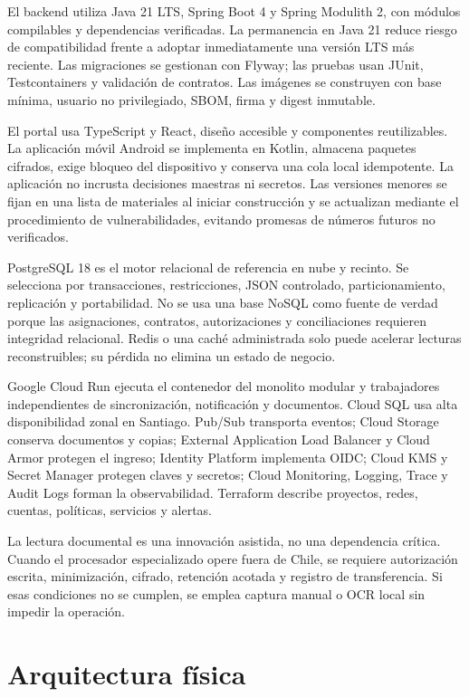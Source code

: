 \documentclass[11pt,letterpaper]{report}
\begin{document}
El backend utiliza Java 21 LTS, Spring Boot 4 y Spring Modulith 2, con módulos compilables y dependencias verificadas. La permanencia en Java 21 reduce riesgo de compatibilidad frente a adoptar inmediatamente una versión LTS más reciente. Las migraciones se gestionan con Flyway; las pruebas usan JUnit, Testcontainers y validación de contratos. Las imágenes se construyen con base mínima, usuario no privilegiado, SBOM, firma y digest inmutable.

El portal usa TypeScript y React, diseño accesible y componentes reutilizables. La aplicación móvil Android se implementa en Kotlin, almacena paquetes cifrados, exige bloqueo del dispositivo y conserva una cola local idempotente. La aplicación no incrusta decisiones maestras ni secretos. Las versiones menores se fijan en una lista de materiales al iniciar construcción y se actualizan mediante el procedimiento de vulnerabilidades, evitando promesas de números futuros no verificados.

PostgreSQL 18 es el motor relacional de referencia en nube y recinto. Se selecciona por transacciones, restricciones, JSON controlado, particionamiento, replicación y portabilidad. No se usa una base NoSQL como fuente de verdad porque las asignaciones, contratos, autorizaciones y conciliaciones requieren integridad relacional. Redis o una caché administrada solo puede acelerar lecturas reconstruibles; su pérdida no elimina un estado de negocio.

Google Cloud Run ejecuta el contenedor del monolito modular y trabajadores independientes de sincronización, notificación y documentos. Cloud SQL usa alta disponibilidad zonal en Santiago. Pub/Sub transporta eventos; Cloud Storage conserva documentos y copias; External Application Load Balancer y Cloud Armor protegen el ingreso; Identity Platform implementa OIDC; Cloud KMS y Secret Manager protegen claves y secretos; Cloud Monitoring, Logging, Trace y Audit Logs forman la observabilidad. Terraform describe proyectos, redes, cuentas, políticas, servicios y alertas.

La lectura documental es una innovación asistida, no una dependencia crítica. Cuando el procesador especializado opere fuera de Chile, se requiere autorización escrita, minimización, cifrado, retención acotada y registro de transferencia. Si esas condiciones no se cumplen, se emplea captura manual o OCR local sin impedir la operación.

\section{Arquitectura física}
\end{document}
